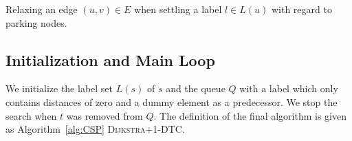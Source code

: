 \begin{algorithm}[htbp]
	\DontPrintSemicolon



	\caption[\textsc{RelaxEdge}]{\label{alg:relax_edge}Relaxing an edge $(u,v) \in E$ when settling a label $l \in L(u)$ with regard to parking nodes.}
\end{algorithm}

\subsection{Initialization and Main Loop}
We initialize the label set $L(s)$ of $s$ and the queue $Q$ with a label which only contains distances of zero and a dummy element as a predecessor. We stop the search when $t$ was removed from $Q$. The definition of the final algorithm is given as Algorithm~\ref{alg:CSP} \textsc{Dijkstra+1-DTC}.

